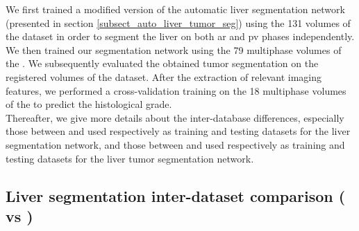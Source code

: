 We first trained a modified version of the automatic liver segmentation network (presented in section \ref{subsect_auto_liver_tumor_seg}) using the 131 volumes of the \textbf{} dataset in order to segment the liver on both \ac{ar} and \ac{pv} phases independently. We then trained our  segmentation network using the 79 multiphase volumes of the \textbf{}. We subsequently evaluated the obtained tumor segmentation on the registered volumes of the \textbf{} dataset. After the extraction of relevant imaging features, we performed a cross-validation training on the 18 multiphase volumes of the \textbf{} to predict the histological grade. \\
Thereafter, we give more details about the inter-database differences, especially those between \textbf{} and \textbf{} used respectively as training and testing datasets for the liver segmentation network, and those between \textbf{} and \textbf{} used respectively as training and testing datasets for the liver tumor segmentation network.

\subsection{Liver segmentation inter-dataset comparison (\textbf{} vs \textbf{})} \label{liver_interdb_comparison}

